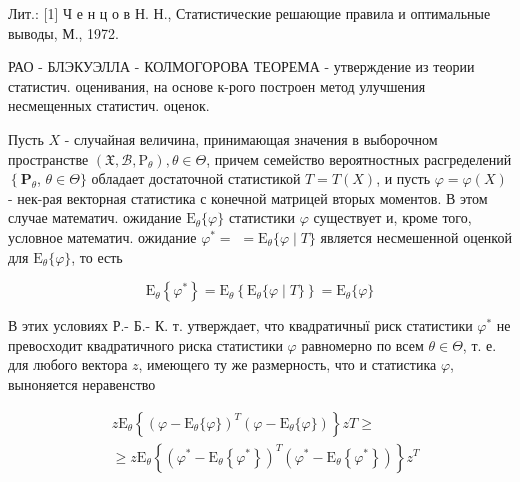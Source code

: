 \documentclass[10pt]{article}
\begin{document}
Лит.: [1] Ч е н ц о в Н. Н., Статистические решающие правила и оптимальные выводы, М., 1972.



РАО - БЛЭКУЭЛЛА - КОЛМОГОРОВА ТЕОРЕМА - утверждение из теории статистич. оценивания, на основе к-рого построен метод улучшения несмещенных статистич. оценок.



Пусть $X$ - случайная величина, принимающая значения в выборочном пространстве $\left(\mathfrak{X}, \mathscr{B}, \mathrm{P}_{\theta}\right), \theta \in \Theta$, причем семейство вероятностных расгределений $\left\{\mathbf{P}_{\theta}\right.$, $\theta \in \Theta\}$ обладает достаточной статистикой $T=T(X)$, и пусть $\varphi=\varphi(X)$ - нек-рая векторная статистика с конечной матрицей вторых моментов. В этом случае математич. ожидание $\mathrm{E}_{\theta}\{\varphi\}$ статистики $\varphi$ существует и, кроме того, условное математич. ожидание $\varphi^{*}=$ $=\mathrm{E}_{\theta}\{\varphi \mid T\}$ является несмешенной оценкой для $\mathrm{E}_{\theta}\{\varphi\}$, то есть



\[

\mathrm{E}_{\theta}\left\{\varphi^{*}\right\}=\mathrm{E}_{\theta}\left\{\mathrm{E}_{\theta}\{\varphi \mid T\}\right\}=\mathrm{E}_{\theta}\{\varphi\}

\]



В этих условиях Р.- Б.- К. т. утверждает, что квадратичныї риск статистики $\varphi^{*}$ не превосходит квадратичного риска статистики $\varphi$ равномерно по всем $\theta \in \Theta$, т. е. для любого вектора $z$, имеющего ту же размерность, что и статистика $\varphi$, выноняется неравенство



\[

\begin{aligned}

& z \mathrm{E}_{\theta}\left\{\left(\varphi-\mathrm{E}_{\theta}\{\varphi\}\right)^{T}\left(\varphi-\mathrm{E}_{\theta}\{\varphi\}\right)\right\} z T \geqslant \\

& \geqslant z \mathrm{E}_{\theta}\left\{\left(\varphi^{*}-\mathrm{E}_{\theta}\left\{\varphi^{*}\right\}\right)^{T}\left(\varphi^{*}-\mathrm{E}_{\theta}\left\{\varphi^{*}\right\}\right)\right\} z^{T}

\end{aligned}

\]
\end{document}
